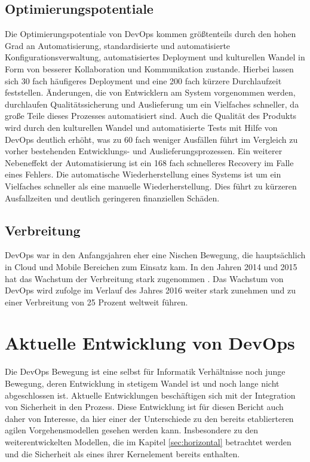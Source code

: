 \subsection{Optimierungspotentiale}
Die Optimierungspotentiale von DevOps kommen größtenteils durch den hohen Grad an Automatisierung, standardisierte und automatisierte Konfigurationsverwaltung, automatisiertes Deployment und kulturellen Wandel in Form von besserer Kollaboration und Kommunikation zustande. 
Hierbei lassen sich 30 fach häufigeres Deployment und eine 200 fach kürzere Durchlaufzeit feststellen. 
Änderungen, die von Entwicklern am System vorgenommen werden, durchlaufen Qualitätssicherung und Auslieferung um ein Vielfaches schneller, da große Teile dieses Prozesses automatisiert sind. 
Auch die Qualität des Produkts wird durch den kulturellen Wandel und automatisierte Tests mit Hilfe von DevOps deutlich erhöht, was zu 60 fach weniger Ausfällen führt im Vergleich zu vorher bestehenden Entwicklungs- und Auslieferungsprozessen. 
Ein weiterer Nebeneffekt der Automatisierung ist ein 168 fach schnelleres Recovery im Falle eines Fehlers. 
Die automatische Wiederherstellung eines Systems ist um ein Vielfaches schneller als eine manuelle Wiederherstellung. 
Dies führt zu kürzeren Ausfallzeiten und deutlich geringeren finanziellen Schäden. 
\parencite[Vgl.][]{DevOpsSODR:2015}

\subsection{Verbreitung}
DevOps war in den Anfangsjahren eher eine Nischen Bewegung, die hauptsächlich in Cloud und Mobile Bereichen zum Einsatz kam. 
In den Jahren 2014 und 2015 hat das Wachstum der Verbreitung stark zugenommen \parencite[vgl.][]{DevOpsSODR:2014, DevOpsSODR:2015}. 
Das Wachstum von DevOps wird \parencite[][]{Gartner:2015} zufolge im Verlauf des Jahres 2016 weiter stark zunehmen und zu einer Verbreitung von 25 Prozent weltweit führen.

\section{Aktuelle Entwicklung von DevOps} %
Die DevOps Bewegung ist eine selbst für Informatik Verhältnisse noch junge Bewegung, deren Entwicklung in stetigem Wandel ist und noch lange nicht abgeschlossen ist. 
Aktuelle Entwicklungen beschäftigen sich mit der Integration von Sicherheit in den Prozess. 
Diese Entwicklung ist für diesen Bericht auch daher von Interesse, da hier einer der Unterschiede zu den bereits etablierteren agilen Vorgehensmodellen gesehen werden kann. 
Insbesondere zu den weiterentwickelten Modellen, die im Kapitel \autoref{sec:horizontal} betrachtet werden und die Sicherheit als eines ihrer Kernelement bereits enthalten.

